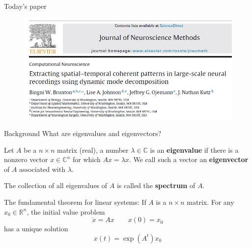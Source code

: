 \documentclass{beamer}
\begin{document}
	\begin{frame}{Today's paper}
		\begin{figure}[h]
			\centering
				\includegraphics[scale=0.45]{../Figures/fig_brunton_paper.png}
		\end{figure}
	\end{frame}
	
	
	\begin{frame}{Background}
		What are eigenvalues and eigenvectors?
		
		Let $A$ be a $n\times n$ matrix  (real), a number $\lambda \in \mathbb{C}$ is an \textbf{eigenvalue} if there is a nonzero vector $x \in \mathbb{C}^n$ for which $Ax= \lambda x$. We call such a vector an \textbf{eigenvector} of $A$ associated with $\lambda$. 
		
		The collection of all eigenvalues of $A$ is called the \textbf{spectrum} of $A$.
		
		The fundamental theorem for linear systems: If $A$ is a $n\times n$ matrix. For any $x_0 \in \mathbb{R}^n$, the initial value problem 
		\begin{equation*}
			\dot{x}=A x \qquad x(0)=x_0
		\end{equation*}
		has a unique solution
		\begin{equation*}
			x(t)= \exp(A^t)x_0
		\end{equation*}
		
	\end{frame}
	
\end{document}
